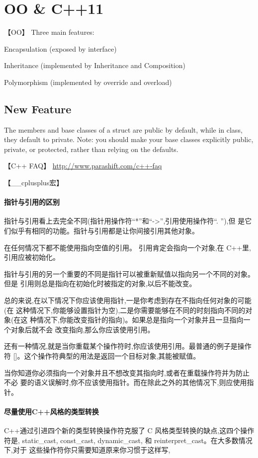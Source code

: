 \chapter{OO \& C++11}
【OO】 Three main features:
\begindot
\item Encapsulation (exposed by interface)
\item Inheritance (implemented by Inheritance and Composition)
\item Polymorphism (implemented by override and overload)
\myenddot

\section{New Feature}
The members and base classes of a struct are public by default, while in class, they default to private. Note: you should make your base classes explicitly public, private, or protected, rather than relying on the defaults.

【C++ FAQ】 \hyperref[C++ FAQ]{http://www.parashift.com/c++-faq}

【__cplusplus宏】

\subsubsection{指针与引用的区别}
指针与引用看上去完全不同(指针用操作符“*”和“->”,引用使用操作符“. ”),但 是它们似乎有相同的功能。指针与引用都是让你间接引用其他对象。

在任何情况下都不能使用指向空值的引用。 引用肯定会指向一个对象,在 C++里,引用应被初始化。

指针与引用的另一个重要的不同是指针可以被重新赋值以指向另一个不同的对象。但是 引用则总是指向在初始化时被指定的对象,以后不能改变。

总的来说,在以下情况下你应该使用指针,一是你考虑到存在不指向任何对象的可能(在 这种情况下,你能够设置指针为空),二是你需要能够在不同的时刻指向不同的对象(在这 种情况下,你能改变指针的指向)。如果总是指向一个对象并且一旦指向一个对象后就不会 改变指向,那么你应该使用引用。

还有一种情况,就是当你重载某个操作符时,你应该使用引用。最普通的例子是操作符 []。这个操作符典型的用法是返回一个目标对象,其能被赋值。

当你知道你必须指向一个对象并且不想改变其指向时,或者在重载操作符并为防止不必 要的语义误解时,你不应该使用指针。而在除此之外的其他情况下,则应使用指针。

\subsubsection{尽量使用C++风格的类型转换}
C++通过引进四个新的类型转换操作符克服了 C 风格类型转换的缺点,这四个操作符是, static_cast, const_cast, dynamic_cast, 和 reinterpret_cast。在大多数情况下,对于 这些操作符你只需要知道原来你习惯于这样写,

